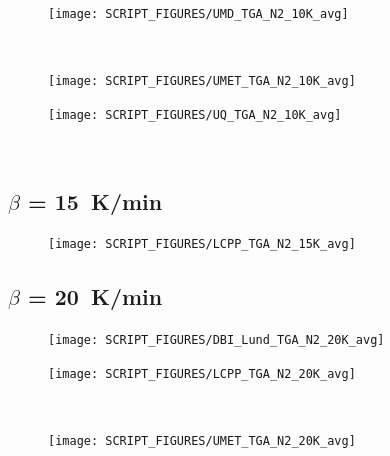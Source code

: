 \documentclass{book}
\begin{document}
\begin{landscape}
\begin{minipage}{0.65\textwidth}
\begin{figure}[H]
\end{figure}
\end{minipage} 
\begin{minipage}{0.35\textwidth}
\begin{figure}[H]
{\texttt{[image: SCRIPT\_FIGURES/UMD\_TGA\_N2\_10K\_avg]}}\\
\end{figure}
\end{minipage}\\
\begin{minipage}{0.65\textwidth}
\begin{figure}[H]
{\texttt{[image: SCRIPT\_FIGURES/UMET\_TGA\_N2\_10K\_avg]}}\\
\end{figure}
\end{minipage} 
\begin{minipage}{0.35\textwidth}
\begin{figure}[H]
{\texttt{[image: SCRIPT\_FIGURES/UQ\_TGA\_N2\_10K\_avg]}}\\
\end{figure}
\end{minipage}\\

\newpage
\subsection{$\beta$ = 15~K/min}
\begin{minipage}{0.65\textwidth}
\begin{figure}[H]
{\texttt{[image: SCRIPT\_FIGURES/LCPP\_TGA\_N2\_15K\_avg]}}\\
\end{figure}
\end{minipage} 

\newpage
\subsection{$\beta$ = 20~K/min}
\begin{minipage}{0.65\textwidth}
\begin{figure}[H]
{\texttt{[image: SCRIPT\_FIGURES/DBI\_Lund\_TGA\_N2\_20K\_avg]}}\\
\end{figure}
\end{minipage} 
\begin{minipage}{0.35\textwidth}
\begin{figure}[H]
{\texttt{[image: SCRIPT\_FIGURES/LCPP\_TGA\_N2\_20K\_avg]}}\\
\end{figure}
\end{minipage}\\
\begin{minipage}{0.65\textwidth}
\begin{figure}[H]
{\texttt{[image: SCRIPT\_FIGURES/UMET\_TGA\_N2\_20K\_avg]}}\\
\end{figure}
\end{minipage} 


\end{landscape}
\end{document}
